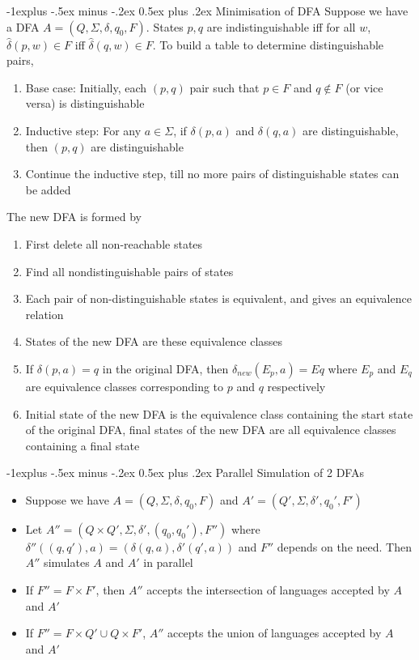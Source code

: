 \documentclass[frenchspacing,9pt,landscape,a4paper]{article}
\makeatletter
\renewcommand{\subsection}{\@startsection{subsection}{2}{0mm}%
                                {-1explus -.5ex minus -.2ex}%
                                {0.5ex plus .2ex}%
                                {\normalfont\normalsize\bfseries}}
\makeatother
\begin{document}
\begin{multicols}{5}
\subsection{Minimisation of DFA}
Suppose we have a DFA $A=(Q,\Sigma,\delta,q_0,F)$. States $p,q$ are indistinguishable iff for all  $w$,
$\hat{\delta}(p,w)\in F$ iff  $\hat{\delta}(q,w)\in F$. To build a table to determine distinguishable
pairs,
\begin{enumerate}
    \item Base case: Initially, each $(p,q)$ pair such that  $p\in F$ and  $q\notin F$ (or vice versa) is
        distinguishable
    \item Inductive step: For any  $a\in\Sigma$, if  $\delta(p,a)$ and  $\delta(q,a)$ are distinguishable,
        then  $(p,q)$ are distinguishable
    \item Continue the inductive step, till no more pairs of distinguishable states can be added
\end{enumerate}
The new DFA is formed by
\begin{enumerate}
    \item First delete all non-reachable states
    \item Find all nondistinguishable pairs of states
    \item Each pair of non-distinguishable states is equivalent, and gives an equivalence relation
    \item States of the new DFA are these equivalence classes
    \item If $\delta(p,a)=q$ in the original DFA, then  $\delta_{new}(E_p,a)=Eq$ where  $E_p$  and $E_q$
        are equivalence classes corresponding to  $p$ and  $q$ respectively
    \item Initial state of the new DFA is the equivalence class containing the start state of the original
        DFA, final states of the new DFA are all equivalence classes containing a final state
\end{enumerate}
\subsection{Parallel Simulation of 2 DFAs}
\begin{itemize}
    \item Suppose we have $A=(Q,\Sigma,\delta,q_0,F)$ and $A'=(Q',\Sigma,\delta',q_0',F')$
    \item Let $A''=(Q\times Q',\Sigma,\delta',(q_0,q_0'),F'')$ where
        $\delta''((q,q'),a)=(\delta(q,a),\delta'(q',a))$ and  $F''$ depends on the need. Then  $A''$
        simulates  $A$ and  $A'$ in parallel 
    \item If $F''=F\times F'$, then  $A''$ accepts the intersection of languages accepted by  $A$ and  $A'$
    \item If  $F''=F\times Q'\cup Q\times F'$,  $A''$ accepts the union of languages accepted by  $A$
        and  $A'$
\end{itemize}

\end{multicols}
\end{document}
